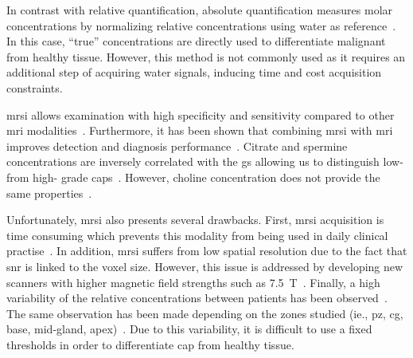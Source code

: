 In contrast with relative quantification, absolute quantification measures molar concentrations by normalizing relative concentrations using water as reference~\cite{Lemaitre2011}.
In this case, ``true'' concentrations are directly used to differentiate malignant from healthy tissue.
However, this method is not commonly used as it requires an additional step of acquiring water signals, inducing time and cost acquisition constraints.

\ac{mrsi} allows examination with high specificity and sensitivity compared to other \ac{mri} modalities~\cite{Choi2007}.
Furthermore, it has been shown that combining \ac{mrsi} with \ac{mri} improves detection and diagnosis performance~\cite{Scheidler1999a,Kaji1998,Vilanova2009}.
Citrate and spermine concentrations are inversely correlated with the \ac{gs} allowing us to distinguish low- from high- grade \acp{cap}~\cite{Giskeodegard2013}.
However, choline concentration does not provide the same properties~\cite{Giskeodegard2013}.

Unfortunately, \ac{mrsi} also presents several drawbacks.
First, \ac{mrsi} acquisition is time consuming which prevents this modality from being used in daily clinical practise~\cite{Barentsz2012}.
In addition, \ac{mrsi} suffers from low spatial resolution due to the fact that \ac{snr} is linked to the voxel size.
However, this issue is addressed by developing new scanners with higher magnetic field strengths such as \SI{7.5}{\tesla}~\cite{Giskeodegard2013}.
Finally, a high variability of the relative concentrations between patients has been observed~\cite{Choi2007}.
The same observation has been made depending on the zones studied (ie., \ac{pz}, \ac{cg}, base, mid-gland, apex)~\cite{Walker2010,Lemaitre2011}.
Due to this variability, it is difficult to use a fixed thresholds in order to differentiate \ac{cap} from healthy tissue.